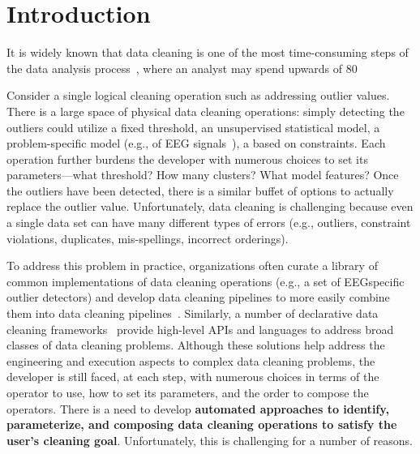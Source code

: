 \section{Introduction}\label{intro}\sloppy

It is widely known that data cleaning is one of the most time-consuming steps of the data analysis process~\cite{nytimes}, where an analyst may spend upwards of 80%

Consider a single logical cleaning operation such as addressing outlier values.  There is a large space of physical data cleaning operations: simply detecting the outliers could utilize a fixed threshold, an unsupervised statistical model, a problem-specific model (e.g., of EEG signals~\cite{}), a based on constraints.  Each operation further burdens the developer with numerous choices to set its parameters---what threshold?  How many clusters? What model features?   Once the outliers have been detected, there is a similar buffet of options to actually replace the outlier value.  Unfortunately, data cleaning is challenging because even a single data set can have many different types of errors (e.g., outliers, constraint violations, duplicates, mis-spellings, incorrect orderings).

To address this problem in practice, organizations often curate a library of common implementations of data cleaning operations (e.g., a set of EEGspecific outlier detectors) and develop data cleaning pipelines to more easily combine them into data cleaning pipelines~\cite{krishnan2016hilda}.  Similarly, a number of declarative data cleaning frameworks~\cite{DBLP:journals/pvldb/HaasKWF015,gokhale2014corleone,stonebraker2013data,giannakopoulou2017cleanm} provide high-level APIs and languages to address broad classes of data cleaning problems.  Although these solutions help address the engineering and execution aspects to complex data cleaning problems, the developer is still faced, at each step, with numerous choices in terms of the operator to use, how to set its parameters, and the order to compose the operators.  There is a need to develop \textbf{automated approaches to identify, parameterize, and composing data cleaning operations to satisfy the user's cleaning goal}.  Unfortunately, this is challenging for a number of reasons.

